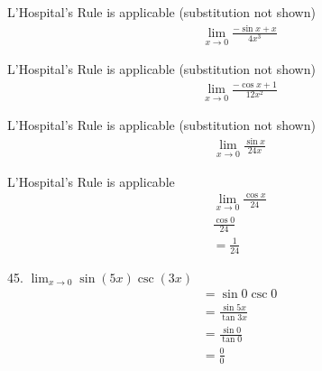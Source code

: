 \documentclass{article}
\begin{document}
\begin{description}
\begin{description}
                L'Hospital's Rule is applicable (substitution not shown)
                \begin{align*}
                   & \lim_{x\to0}\frac{-\sin{x} + x}{4x^3}
                \end{align*}

                L'Hospital's Rule is applicable (substitution not shown)
                \begin{align*}
                   & \lim_{x\to0}\frac{-\cos{x} + 1}{12x^2}
                \end{align*}

                L'Hospital's Rule is applicable (substitution not shown)
                \begin{align*}
                   & \lim_{x\to0}\frac{\sin{x}}{24x}
                \end{align*}

                L'Hospital's Rule is applicable
                \begin{align*}
                   & \lim_{x\to0}\frac{\cos{x}}{24} \\[1em]
                   & \frac{\cos{0}}{24}             \\[1em]
                   & =  \boxed{\frac{1}{24}}
                \end{align*}
          \item 45. $\lim_{x\to0}\sin{(5x)}\csc{(3x)}$
                \begin{align*}
                   & =  \sin{0}\csc{0}           \\[1em]
                   & = \frac{\sin{5x}}{\tan{3x}} \\[1em]
                   & = \frac{\sin{0}}{\tan{0}}   \\[1em]
                   & =  \frac{0}{0}              \\
                \end{align*}


\end{description}
\end{description}
\end{document}

